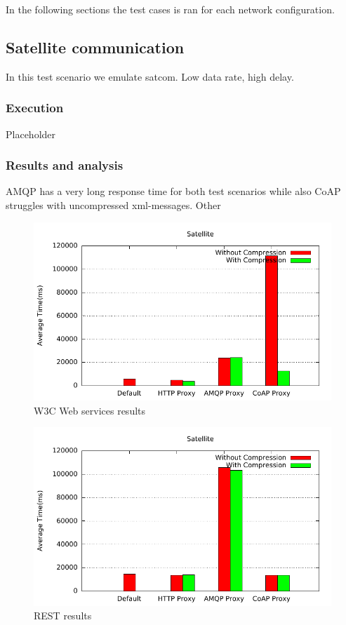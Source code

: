 In the following sections the test cases is ran for each network
configuration.


\subsection{Satellite communication}

In this test scenario we emulate \gls{satcom}. Low data rate, high delay.

\subsubsection{Execution}
Placeholder

\subsubsection{Results and analysis}
AMQP has a very long response time for both test scenarios while also CoAP
struggles with uncompressed xml-messages. Other

\begin{figure}[H]
\center
\includegraphics[scale=0.75]{../results/satellite/nffi/out.pdf}
\caption{W3C Web services results}
\end{figure}

\begin{figure}[H]
\center
\includegraphics[scale=0.75]{../results/satellite/rest/out.pdf}
\caption{REST results}
\end{figure}

